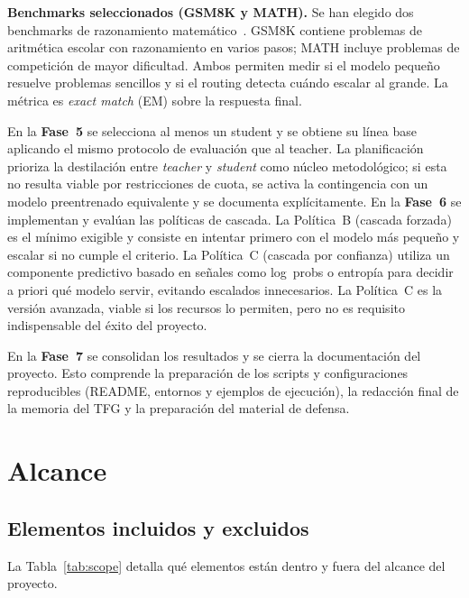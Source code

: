 \textbf{Benchmarks seleccionados (GSM8K y MATH).} Se han elegido dos benchmarks de razonamiento matemático~\cite{cobbe2021gsm8k, hendrycks2021math}. GSM8K contiene problemas de aritmética escolar con razonamiento en varios pasos; MATH incluye problemas de competición de mayor dificultad. Ambos permiten medir si el modelo pequeño resuelve problemas sencillos y si el routing detecta cuándo escalar al grande. La métrica es \textit{exact match} (EM) sobre la respuesta final.

En la \textbf{Fase~5} se selecciona al menos un student y se obtiene su línea base aplicando el mismo protocolo de evaluación que al teacher. La planificación prioriza la destilación entre \textit{teacher} y \textit{student} como núcleo metodológico; si esta no resulta viable por restricciones de cuota, se activa la contingencia con un modelo preentrenado equivalente y se documenta explícitamente. En la \textbf{Fase~6} se implementan y evalúan las políticas de cascada. La Política~B (cascada forzada) es el mínimo exigible y consiste en intentar primero con el modelo más pequeño y escalar si no cumple el criterio. La Política~C (cascada por confianza) utiliza un componente predictivo basado en señales como log~probs o entropía para decidir a priori qué modelo servir, evitando escalados innecesarios. La Política~C es la versión avanzada, viable si los recursos lo permiten, pero no es requisito indispensable del éxito del proyecto.

En la \textbf{Fase~7} se consolidan los resultados y se cierra la documentación del proyecto. Esto comprende la preparación de los scripts y configuraciones reproducibles (README, entornos y ejemplos de ejecución), la redacción final de la memoria del TFG y la preparación del material de defensa.

\section{Alcance}

\subsection{Elementos incluidos y excluidos}

La Tabla~\ref{tab:scope} detalla qué elementos están dentro y fuera del alcance del proyecto.

